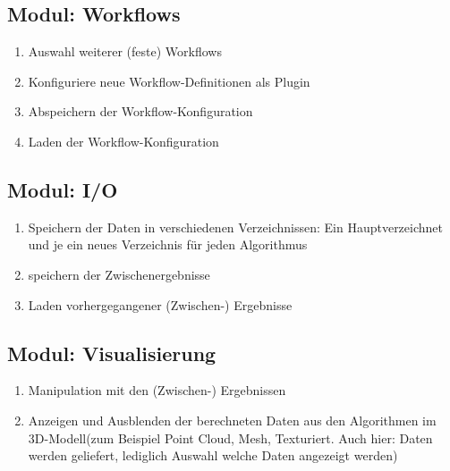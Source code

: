 	\subsection{Modul: Workflows}
		\begin{enumerate}[ align=left, label={\textbf{\textbackslash FK2\arabic*0\textbackslash}} ]
			 \item Auswahl weiterer (feste) Workflows
			 \item Konfiguriere neue Workflow-Definitionen als Plugin
			 \item Abspeichern der Workflow-Konfiguration
			 \item Laden der Workflow-Konfiguration
		\end{enumerate}
		
	\subsection{Modul: I/O}
		\begin{enumerate}[ align=left, label={\textbf{\textbackslash FK2\arabic*0\textbackslash}} ]
			\item Speichern der Daten in verschiedenen Verzeichnissen: Ein Hauptverzeichnet und je ein neues Verzeichnis für jeden Algorithmus
			\item speichern der Zwischenergebnisse
			\item Laden vorhergegangener (Zwischen-) Ergebnisse
		\end{enumerate}

	\subsection{Modul: Visualisierung}
		\begin{enumerate}[ align=left, label={\textbf{\textbackslash FK1\arabic*0\textbackslash}} ]
			 \item Manipulation mit den (Zwischen-) Ergebnissen
			 \item Anzeigen und Ausblenden der berechneten Daten aus den Algorithmen im 3D-Modell(zum Beispiel Point Cloud, Mesh, Texturiert. Auch hier: Daten werden geliefert, lediglich Auswahl welche Daten angezeigt werden)
		\end{enumerate}

